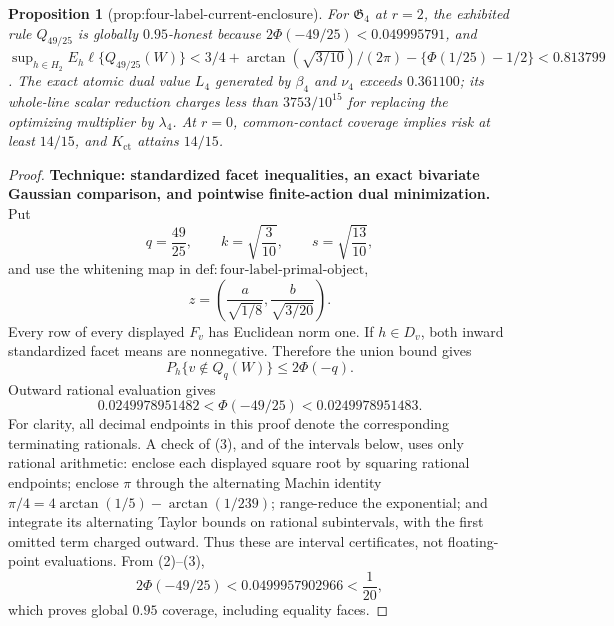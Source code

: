 \documentclass{article}
\newtheorem{proposition}{Proposition}
\begin{document}
\begin{proposition}[prop:four-label-current-enclosure]\label{prop:four-label-current-enclosure}
For \(\mathfrak G_4\) at \(r=2\), the exhibited rule \(Q_{49/25}\) is globally \(0.95\)-honest because \(2\Phi(-49/25)<0.049995791\), and \(\sup_{h\in H_2}E_h\ell\{Q_{49/25}(W)\}<3/4+\arctan(\sqrt{3/10})/(2\pi)-\{\Phi(1/25)-1/2\}<0.813799\). The exact atomic dual value \(L_4\) generated by \(\beta_4\) and \(\nu_4\) exceeds \(0.361100\); its whole-line scalar reduction charges less than \(3753/10^{15}\) for replacing the optimizing multiplier by \(\lambda_4\). At \(r=0\), common-contact coverage implies risk at least \(14/15\), and \(K_{\mathrm{ct}}\) attains \(14/15\).
\end{proposition}
\begin{proof}
\textbf{Technique: standardized facet inequalities, an exact bivariate
Gaussian comparison, and pointwise finite-action dual minimization.}
Put
\[
 q=\frac{49}{25},\qquad k=\sqrt{\frac3{10}},\qquad
 s=\sqrt{\frac{13}{10}},
\]
and use the whitening map in
\(\mathrm{def:four\mbox{-}label\mbox{-}primal\mbox{-}object}\),
\[
 z=\left(\frac a{\sqrt{1/8}},\frac b{\sqrt{3/20}}\right).
\tag{1}
\]
Every row of every displayed \(F_v\) has Euclidean norm one.  If
\(h\in D_v\), both inward standardized facet means are nonnegative.
Therefore the union bound gives
\[
 P_h\{v\notin Q_q(W)\}\leq2\Phi(-q).
\tag{2}
\]
Outward rational evaluation gives
\[
 0.0249978951482
 <\Phi(-49/25)
 <0.0249978951483.
\tag{3}
\]
For clarity, all decimal endpoints in this proof denote the corresponding
terminating rationals.  A check of (3), and of the intervals below, uses
only rational arithmetic: enclose each displayed square root by squaring
rational endpoints; enclose \(\pi\) through the alternating Machin identity
\(\pi/4=4\arctan(1/5)-\arctan(1/239)\); range-reduce the exponential; and
integrate its alternating Taylor bounds on rational subintervals, with the
first omitted term charged outward.  Thus these are interval certificates,
not floating-point evaluations.  From (2)--(3),
\[
 2\Phi(-49/25)<0.0499957902966<\frac1{20},
\]
which proves global \(0.95\) coverage, including equality faces.


\end{proof}
\end{document}
